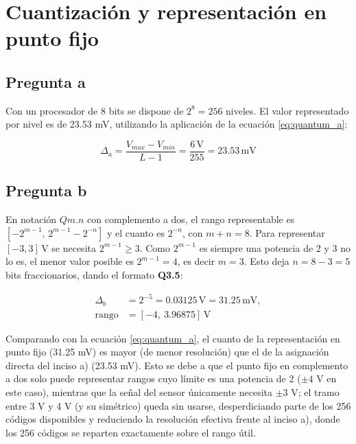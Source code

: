 \documentclass[conference]{IEEEtran}
\begin{document}

\section{Cuantización y representación en punto fijo}

\subsection{Pregunta a}

Con un procesador de 8 bits se dispone de $2^8=256$ niveles. 
El valor representado por nivel es de 23.53 mV, utilizando la aplicación de la ecuación \eqref{eq:quantum_a}:

\begin{equation}
\Delta_a = \frac{V_{max}-V_{min}}{L-1} = \frac{6\,\text{V}}{255} = 23.53\,\text{mV}
\label{eq:quantum_a}
\end{equation}

\subsection{Pregunta b}

En notación $Qm.n$ con complemento a dos, el rango representable es $[-2^{m-1},\,2^{m-1}-2^{-n}]$ y el cuanto es $2^{-n}$, con $m+n=8$. 
Para representar $[-3,3]\,\text{V}$ se necesita $2^{m-1}\geq3$.
Como $2^{m-1}$ es siempre una potencia de 2 y 3 no lo es, el menor valor posible es $2^{m-1}=4$, es decir $m=3$. Esto deja $n=8-3=5$ bits fraccionarios, dando el formato \textbf{Q3.5}:

\begin{equation}
\begin{aligned}
\Delta_b &= 2^{-5} = 0.03125\,\text{V} = 31.25\,\text{mV},\\
\text{rango} &= [-4,\ 3.96875]\,\text{V}
\end{aligned}
\label{eq:quantum_b}
\end{equation}

Comparando con la ecuación \eqref{eq:quantum_a}, el cuanto de la representación en punto fijo (31.25 mV) es mayor (de menor resolución) que el de la asignación directa del inciso a) (23.53 mV). 
Esto se debe a que el punto fijo en complemento a dos solo puede representar rangos cuyo límite es una potencia de 2 ($\pm4$ V en este caso), mientras que la señal del sensor únicamente necesita $\pm3$ V; el tramo entre 3 V y 4 V (y su simétrico) queda sin usarse, desperdiciando parte de los 256 códigos disponibles y reduciendo la resolución efectiva frente al inciso a), donde los 256 códigos se reparten exactamente sobre el rango útil.
\end{document}
